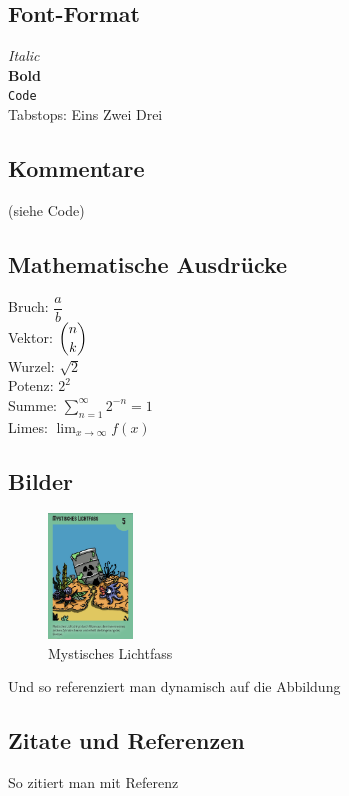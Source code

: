 
\subsection{Font-Format}
\emph{Italic} \\
\textbf{Bold} \\
\texttt{Code} \\
Tabstops: Eins \quad Zwei \quad Drei

\subsection{Kommentare}
(siehe Code)

\subsection{Mathematische Ausdrücke}
Bruch: $\dfrac{a}{b}$ \\
Vektor: $\dbinom{n}{k}$ \\
Wurzel: $\sqrt{2}$ \\
Potenz: $2^{2}$ \\
Summe: $\sum_{n=1}^{\infty} 2^{-n} = 1$ \\
Limes: $\lim_{x\to\infty} f(x)$

\subsection{Bilder}
\begin{figure}[h]
\includegraphics[width=0.2\textwidth]{../img/demo_img.PNG}
\caption{Mystisches Lichtfass}
\label{fig:mystisches_lichtfass}
\end{figure}
Und so referenziert man dynamisch auf die Abbildung 

\subsection{Zitate und Referenzen}
So zitiert man mit Referenz \cite[Seite 100]{Test1}

